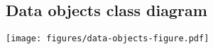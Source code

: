 \documentclass{article}
\begin{document}
\subsection{Data objects class diagram}
\label{sec:appendix:data-objects-class-diagram}
% 

\texttt{[image: figures/data-objects-figure.pdf]}
\end{document}
